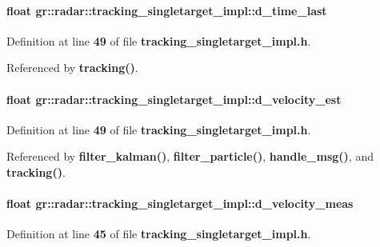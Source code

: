 \paragraph[{d\+\_\+time\+\_\+last}]{\setlength{\rightskip}{0pt plus 5cm}float gr\+::radar\+::tracking\+\_\+singletarget\+\_\+impl\+::d\+\_\+time\+\_\+last}\label{classgr_1_1radar_1_1tracking__singletarget__impl_aa23309c524ff1eb698ae99331d71e87d}


Definition at line {\bf 49} of file {\bf tracking\+\_\+singletarget\+\_\+impl.\+h}.



Referenced by {\bf tracking()}.

\paragraph[{d\+\_\+velocity\+\_\+est}]{\setlength{\rightskip}{0pt plus 5cm}float gr\+::radar\+::tracking\+\_\+singletarget\+\_\+impl\+::d\+\_\+velocity\+\_\+est}\label{classgr_1_1radar_1_1tracking__singletarget__impl_a2d5840dea36c3a0448d9a5b9d664c41a}


Definition at line {\bf 49} of file {\bf tracking\+\_\+singletarget\+\_\+impl.\+h}.



Referenced by {\bf filter\+\_\+kalman()}, {\bf filter\+\_\+particle()}, {\bf handle\+\_\+msg()}, and {\bf tracking()}.

\paragraph[{d\+\_\+velocity\+\_\+meas}]{\setlength{\rightskip}{0pt plus 5cm}float gr\+::radar\+::tracking\+\_\+singletarget\+\_\+impl\+::d\+\_\+velocity\+\_\+meas}\label{classgr_1_1radar_1_1tracking__singletarget__impl_af3477733e48fbe4ea356902707000b63}


Definition at line {\bf 45} of file {\bf tracking\+\_\+singletarget\+\_\+impl.\+h}.




